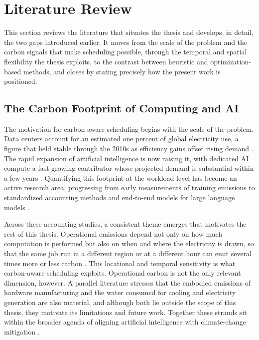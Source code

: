 \section{Literature Review}
\label{sec:litreview}

This section reviews the literature that situates the thesis and develops, in detail, the two gaps introduced earlier. It moves from the scale of the problem and the carbon signals that make scheduling possible, through the temporal and spatial flexibility the thesis exploits, to the contrast between heuristic and optimization-based methods, and closes by stating precisely how the present work is positioned.

\subsection{The Carbon Footprint of Computing and AI}
\label{sec:lr-footprint}

The motivation for carbon-aware scheduling begins with the scale of the problem. Data centers account for an estimated one percent of global electricity use, a figure that held stable through the 2010s as efficiency gains offset rising demand \citep{masanet2020recalibrating}. The rapid expansion of artificial intelligence is now raising it, with dedicated AI compute a fast-growing contributor whose projected demand is substantial within a few years \citep{devries2023growing}. Quantifying this footprint at the workload level has become an active research area, progressing from early measurements of training emissions \citep{strubell2019energy} to standardized accounting methods \citep{lannelongue2021greenalgorithms, henderson2020towards} and end-to-end models for large language models \citep{faiz2024llmcarbon, luccioni2023estimating}.

Across these accounting studies, a consistent theme emerges that motivates the rest of this thesis. Operational emissions depend not only on how much computation is performed but also on when and where the electricity is drawn, so that the same job run in a different region or at a different hour can emit several times more or less carbon \citep{dodge2022measuring, patterson2022carbon}. This locational and temporal sensitivity is what carbon-aware scheduling exploits. Operational carbon is not the only relevant dimension, however. A parallel literature stresses that the embodied emissions of hardware manufacturing \citep{gupta2021chasing} and the water consumed for cooling and electricity generation \citep{li2023thirsty} are also material, and although both lie outside the scope of this thesis, they motivate its limitations and future work. Together these strands sit within the broader agenda of aligning artificial intelligence with climate-change mitigation \citep{kaack2022aligning}.

